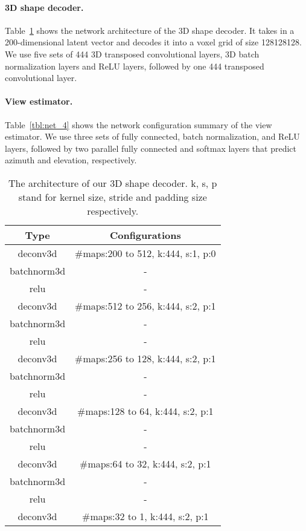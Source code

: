 \documentclass[10pt,twocolumn,letterpaper]{article}
\newcommand{\tbl}[1]{Table~\ref{#1}}
\newcommand{\myparagraph}[1]{\vspace{-14pt}\paragraph{#1}}
\begin{document}
\myparagraph{3D shape decoder. }
\tbl{tbl:net_3} shows the network architecture of the 3D shape decoder. It takes in a 200-dimensional latent vector and decodes it into a voxel grid of size 128128128. We use five sets of 444 3D transposed convolutional layers, 3D batch normalization layers and ReLU layers, followed by one 444 transposed convolutional layer.

\myparagraph{View estimator. }
\tbl{tbl:net_4} shows the network configuration summary of the view estimator. We use three sets of fully connected, batch normalization, and ReLU layers, followed by two parallel fully connected and softmax layers that predict azimuth and elevation, respectively.

	\begin{table}[t]
         	\centering
            \begin{tabular}{cc}
            \toprule
            Type & Configurations\\
            \midrule
            deconv3d & \#maps:200 to 512, k:444, s:1, p:0 \\
            batchnorm3d & - \\
            relu & - \\
            deconv3d & \#maps:512 to 256, k:444, s:2, p:1 \\
            batchnorm3d & - \\
            relu & - \\
            deconv3d & \#maps:256 to 128, k:444, s:2, p:1 \\
            batchnorm3d & - \\
            relu & - \\
            deconv3d & \#maps:128 to 64, k:444, s:2, p:1 \\
            batchnorm3d & - \\
            relu & - \\
            deconv3d & \#maps:64 to 32, k:444, s:2, p:1 \\
            batchnorm3d & - \\
            relu & - \\
            deconv3d & \#maps:32 to 1, k:444, s:2, p:1 \\
            \bottomrule
            \end{tabular}
            \caption{The architecture of our 3D shape decoder. k, s, p stand for kernel size, stride and padding size respectively.}
            \label{tbl:net_3}
        \end{table}
\end{document}
